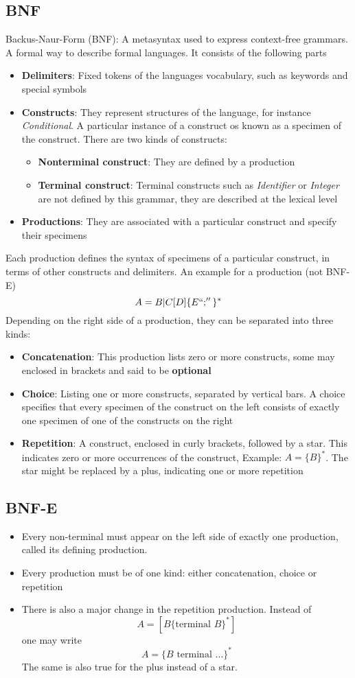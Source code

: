 \documentclass[a4paper]{article}
\begin{document}
\subsection{BNF}
Backus-Naur-Form (BNF): A metasyntax used to express context-free grammars. A formal way to describe formal languages. It consists of the following parts
\begin{itemize}
\item \textbf{Delimiters}: Fixed tokens of the languages vocabulary, such as keywords and special symbols
\item \textbf{Constructs}: They represent structures of the language, for instance \emph{Conditional}. A particular instance of a construct os known as a specimen of the construct. There are two kinds of constructs:
\begin{itemize}
\item \textbf{Nonterminal construct}: They are defined by a production
\item \textbf{Terminal construct}: Terminal constructs such as \emph{Identifier} or \emph{Integer} are not defined by this grammar, they are described at the lexical level
\end{itemize}
\item \textbf{Productions}: They are associated with a particular construct and specify their specimens
\end{itemize}
Each production defines the syntax of specimens of a particular construct, in terms of other constructs and delimiters. An example for a production (not BNF-E) 
\[A=B|C[D]\{ E``;''\}^*\]
Depending on the right side of a production, they can be separated into three kinds:
\begin{itemize}
\item \textbf{Concatenation}: This production lists zero or more constructs, some may enclosed in brackets and said to be \textbf{optional}
\item\textbf{Choice}: Listing one or more constructs, separated by vertical bars. A choice specifies that every specimen of the construct on the left consists of exactly one specimen of one of the constructs on the right
\item \textbf{Repetition}: A construct, enclosed in curly brackets, followed by a star. This indicates zero or more occurrences of the construct, Example: $A=\{ B\}^*$. The star might be replaced by a plus, indicating one or more repetition
\end{itemize}
\subsection{BNF-E}
\begin{itemize}
\item Every non-terminal must appear on the left side of exactly one production, called its defining production. 
\item Every production must be of one kind: either concatenation, choice or repetition
\item There is also a major change in the repetition production. Instead of \[A=[B \{\text{terminal }B\}^*]\] one may write \[A=\{B\text{ terminal }\dots\}^*\] The same is also true for the plus instead of a star.
\end{itemize}
\end{document}
